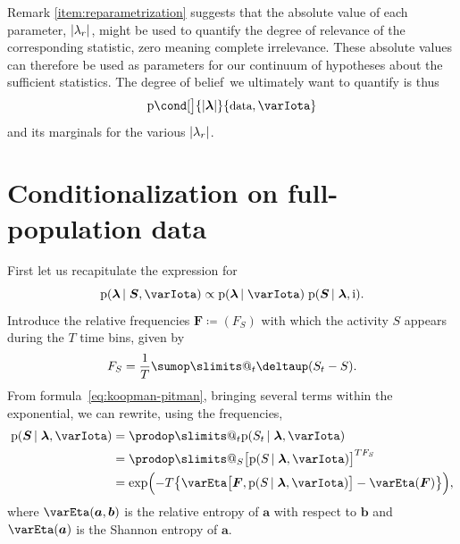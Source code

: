 \documentclass[\ifafour a4paper,12pt,\else a5paper,10pt,\fi%
onecolumn,oneside,article,%
british%
]{memoir}
\makeatletter
\theoremstyle{remark}
\theoremstyle{innote}
\def\sum{\DOTSI\sumop\slimits@}
\def\prod{\DOTSI\prodop\slimits@}
\newcommand*{\delt}{\deltaup}%
\newcommand*{\I}{\mathrm{i}}%
\newcommand*{\defd}{\coloneqq}
\DeclarePairedDelimiter\abs{\lvert}{\rvert}
\newcommand*{\pf}{\mathrm{p}}%
\renewcommand*{\|}{\nonscript\,\vert\nonscript\;\mathopen{}}
\newcommand*{\tsum}{\mathop{\textstyle\sum}\nolimits}
\newcommand*{\ptext}[1]{\text{\small #1}}
\newcommand*{\dob}{degree of belief}
\newcommand*{\yS}{S}
\newcommand*{\ySt}{\bm{\yS}}
\newcommand*{\yll}{\lambda}
\newcommand*{\yl}{\bm{\lambda}}
\newcommand*{\yg}{g}
\newcommand*{\yI}{\varIota}
\newcommand*{\yF}{\bm{F}}
\newcommand*{\yH}{\varEta}
\makeatother
\begin{document}
Remark \ref{item:reparametrization} suggests that the absolute value of
each parameter, $\abs{\yll_{r}}$, might be used to quantify the degree of
relevance of the corresponding statistic, zero meaning complete
irrelevance. These absolute values can therefore be used as parameters for
our continuum of hypotheses about the sufficient statistics. The \dob\ we
ultimately want to quantify is thus
\begin{equation}
  \label{eq:posterior_hypotheses_data}
  \pf\cond[\big]{\abs{\yl}}{\ptext{data}, \yI}
\end{equation}
and its marginals for the various $\abs{\yll_{r}}$.

\section{Conditionalization on full-population data}
\label{sec:full-pop_data}

First let us recapitulate the expression for
\begin{equation}
  \label{eq:posterior_given_full_population}
  \pf(\yl \| \ySt, \yI) \propto \pf(\yl \| \yI)\;
  \pf(\ySt \| \yl, \I).
\end{equation}
Introduce the relative frequencies $\yF \defd (F_{\yS})$ with which the
activity $\yS$ appears during the $T$ time bins, given by
\begin{equation}
  \label{eq:frequencies}
  F_{\yS} = \frac{1}{T}\sum_{t}\delt(\yS_{t}-\yS).
\end{equation}
From formula~\eqref{eq:koopman-pitman}, bringing several terms within the
exponential, we can rewrite, using the frequencies,
\begin{equation}
  \label{eq:to_maxent}
  \begin{split}
  \pf(\ySt \| \yl, \yI) &= \prod_{t} \pf(\yS_{t} \| \yl, \yI)
    \\ &=
    \prod_{\yS}\bigl[ \pf(\yS \| \yl, \yI) \bigr]^{T F_{\yS}}
    \\ &=
    \exp\Bigl(-T\bigl\{
    \yH\bigl[\yF, \pf(\yS \| \yl, \yI)\bigr]
    -\yH(\yF)\bigr\}\Bigr),
\end{split}
\end{equation}
where $\yH(\bm{a},\bm{b})$ is the relative entropy of $\bm{a}$ with respect
to $\bm{b}$ and $\yH(\bm{a})$ is the Shannon entropy of $\bm{a}$.
\end{document}
